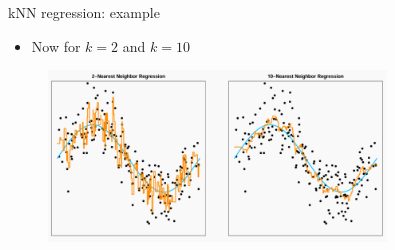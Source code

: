 \documentclass[serif, aspectratio=169]{beamer}
\begin{document}
\begin{frame}{kNN regression: example}
    \begin{itemize}
        \item Now for $k=2$ and $k=10$
    \end{itemize}
    
    \begin{figure}[h]
            \centering
            
            \includegraphics[width=0.8\textwidth]{pic/knnReg2.png}
            \end{figure}
            
    
\end{frame}
\end{document}
